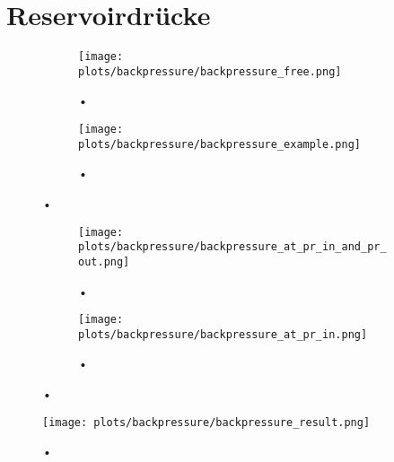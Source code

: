 \section{Reservoirdrücke}
\label{sec:reservoirs}


\begin{figure}[H]
    \centering
    \begin{subfigure}[H]{0.4\textwidth}
        \texttt{[image: plots/backpressure/backpressure\_free.png]}
        \caption{•}
    \end{subfigure}
    \begin{subfigure}[H]{0.4\textwidth}
        \texttt{[image: plots/backpressure/backpressure\_example.png]}
        \caption{•}
    \end{subfigure}
    \caption{•}
\end{figure}

\begin{figure}[H]
    \centering
    \begin{subfigure}[H]{0.4\textwidth}
        \texttt{[image: plots/backpressure/backpressure\_at\_pr\_in\_and\_pr\_out.png]}
        \caption{•}
    \end{subfigure}
    \begin{subfigure}[H]{0.4\textwidth}
        \texttt{[image: plots/backpressure/backpressure\_at\_pr\_in.png]}
        \caption{•}
    \end{subfigure}
    \caption{•}
\end{figure}



\begin{figure}[H]
	\centering
	\texttt{[image: plots/backpressure/backpressure\_result.png]}
	\caption{•}
\end{figure}